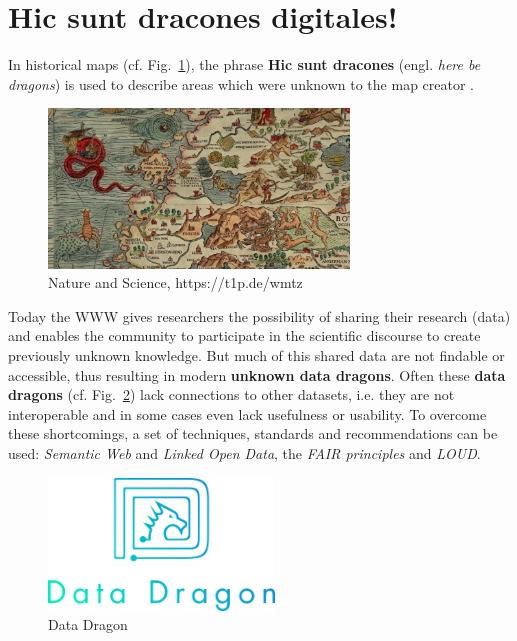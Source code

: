 \documentclass[twocolumn]{autart}
\begin{document}
\section{Hic sunt dracones digitales!}

In historical maps (cf. Fig.~\ref{map}), the phrase \textbf{Hic sunt dracones} (engl. \textit{here be dragons}) is used to describe areas which were unknown to the map creator \cite{wuttke_here_2019}. 

\begin{figure}[!htb]
\begin{center}
\includegraphics[width=8cm]{Beyond-This-here-be-no-dragons-blog-copy-881x467.jpg}
\caption{Nature and Science, https://t1p.de/wmtz}
\label{map}
\end{center}
\end{figure}

Today the WWW gives researchers the possibility of sharing their research (data) and enables the community to participate in the scientific discourse to create previously unknown knowledge. But much of this shared data are not findable or accessible, thus resulting in modern \textbf{unknown data dragons}. Often these \textbf{data dragons} (cf. Fig.~\ref{datadragon}) lack connections to other datasets, i.e. they are not interoperable and in some cases even lack usefulness or usability. To overcome these shortcomings, a set of techniques, standards and recommendations can be used: \textit{Semantic Web} and \textit{Linked Open Data}, the \textit{FAIR principles} and \textit{LOUD}.

\begin{figure}[!htb]
\begin{center}
\includegraphics[width=6cm]{datadragon.png}
\caption{Data Dragon}
\label{datadragon}
\end{center}
\end{figure}
\end{document}
